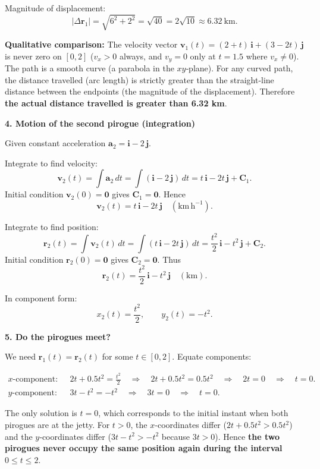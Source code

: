 \documentclass[11pt]{article}
\begin{document}
\begin{exemplebox}
Magnitude of displacement:
\[
|\Delta\mathbf{r}_1| = \sqrt{6^2 + 2^2} = \sqrt{40} = 2\sqrt{10} \approx 6.32\ \mathrm{km}.
\]

\textbf{Qualitative comparison:} The velocity vector $\mathbf{v}_1(t) = (2+t)\,\mathbf{i} + (3-2t)\,\mathbf{j}$ is never zero on $[0,2]$ ($v_x>0$ always, and $v_y=0$ only at $t=1.5$ where $v_x\neq0$). The path is a smooth curve (a parabola in the $xy$‑plane). For any curved path, the distance travelled (arc length) is strictly greater than the straight‑line distance between the endpoints (the magnitude of the displacement). Therefore \textbf{the actual distance travelled is greater than 6.32 km}.

\vspace{4pt}
\textbf{4. Motion of the second pirogue (integration)}

Given constant acceleration $\mathbf{a}_2 = \mathbf{i} - 2\,\mathbf{j}$.

Integrate to find velocity:
\[
\mathbf{v}_2(t) = \int \mathbf{a}_2\,dt = \int (\mathbf{i} - 2\,\mathbf{j})\,dt = t\,\mathbf{i} - 2t\,\mathbf{j} + \mathbf{C}_1.
\]
Initial condition $\mathbf{v}_2(0)=\mathbf{0}$ gives $\mathbf{C}_1 = \mathbf{0}$. Hence
\[
\mathbf{v}_2(t) = t\,\mathbf{i} - 2t\,\mathbf{j} \quad (\mathrm{km\,h^{-1}}).
\]

Integrate to find position:
\[
\mathbf{r}_2(t) = \int \mathbf{v}_2(t)\,dt = \int (t\,\mathbf{i} - 2t\,\mathbf{j})\,dt = \frac{t^2}{2}\,\mathbf{i} - t^2\,\mathbf{j} + \mathbf{C}_2.
\]
Initial condition $\mathbf{r}_2(0)=\mathbf{0}$ gives $\mathbf{C}_2 = \mathbf{0}$. Thus
\[
\mathbf{r}_2(t) = \frac{t^2}{2}\,\mathbf{i} - t^2\,\mathbf{j} \quad (\mathrm{km}).
\]

In component form:
\[
x_2(t) = \frac{t^2}{2}, \qquad y_2(t) = -t^2.
\]

\vspace{4pt}
\textbf{5. Do the pirogues meet?}

We need $\mathbf{r}_1(t) = \mathbf{r}_2(t)$ for some $t\in[0,2]$. Equate components:

\begin{align*}
x\text{-component:} &\quad 2t + 0.5t^2 = \frac{t^2}{2} \quad\Rightarrow\quad 2t + 0.5t^2 = 0.5t^2 \quad\Rightarrow\quad 2t = 0 \quad\Rightarrow\quad t = 0. \\[4pt]
y\text{-component:} &\quad 3t - t^2 = -t^2 \quad\Rightarrow\quad 3t = 0 \quad\Rightarrow\quad t = 0.
\end{align*}

The only solution is $t=0$, which corresponds to the initial instant when both pirogues are at the jetty. For $t>0$, the $x$‑coordinates differ ($2t+0.5t^2 > 0.5t^2$) and the $y$‑coordinates differ ($3t-t^2 > -t^2$ because $3t>0$). Hence \textbf{the two pirogues never occupy the same position again during the interval $0\le t\le 2$}.

\end{exemplebox}
\end{document}
